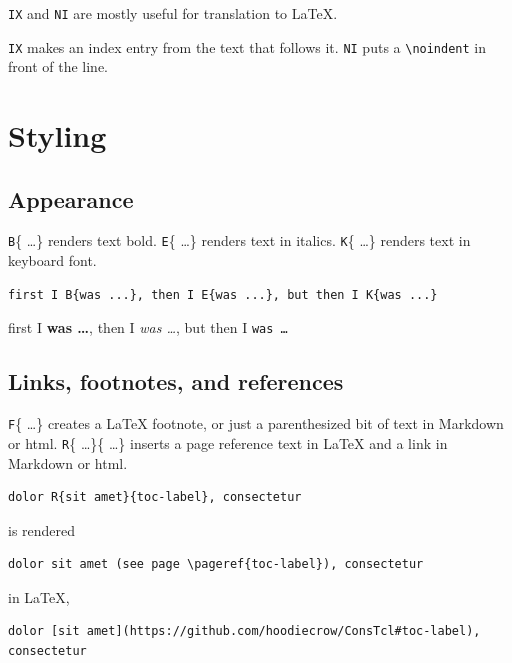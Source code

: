 \documentclass{report}
\begin{document}
\texttt{IX} and \texttt{NI} are mostly useful for translation to \LaTeX{}.

\texttt{IX} makes an index entry from the text that follows it. \texttt{NI} puts a \texttt{\textbackslash noindent} in front of the line.

\chapter{Styling}
\label{styling}

\section{Appearance}
\label{appearance}

\texttt{B}\{ \ldots  \} renders text bold. \texttt{E}\{ \ldots  \} renders text in italics. \texttt{K}\{ \ldots  \} renders text in keyboard font.

\begin{verbatim}
first I B{was ...}, then I E{was ...}, but then I K{was ...}
\end{verbatim}

first I \textbf{was \ldots }, then I \emph{was \ldots }, but then I \texttt{was \ldots }

\section{Links, footnotes, and references}
\label{links-footnotes-and-references}

\texttt{F}\{ \ldots  \} creates a \LaTeX{} footnote, or just a parenthesized bit of text in Markdown or html. \texttt{R}\{ \ldots  \}\{ \ldots  \} inserts a page reference text in \LaTeX{} and a link in Markdown or html.

\begin{verbatim}
dolor R{sit amet}{toc-label}, consectetur
\end{verbatim}

is rendered

\begin{verbatim}
dolor sit amet (see page \pageref{toc-label}), consectetur
\end{verbatim}

in \LaTeX{},

\begin{verbatim}
dolor [sit amet](https://github.com/hoodiecrow/ConsTcl#toc-label), consectetur
\end{verbatim}
\end{document}
